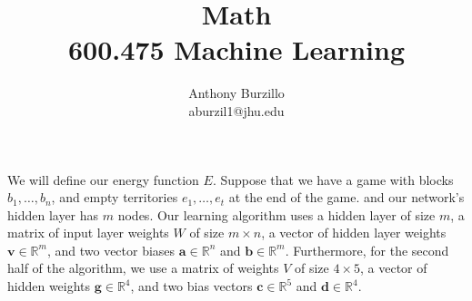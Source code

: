 \documentclass{amsart}
\title{Math\\600.475 Machine Learning}
\author{Anthony Burzillo\\aburzil1@jhu.edu}
\def\v#1{\mathbf{#1}}
\begin{document}
\maketitle

\def\touches#1#2{\mbox{touches}_{#1}{\left(#2\right)}}
\def\color#1{\mbox{color}{\left(#1\right)}}
\def\size#1{\mbox{size}{\left(#1\right)}}

We will define our energy function $E$. Suppose that we have a game with blocks $b_1, \ldots, b_n$, and empty territories
$e_1, \ldots, e_t$ at the end of the game.  and our network's hidden layer has $m$ nodes. Our learning algorithm uses a
hidden layer of size $m$, a matrix of input layer weights $W$ of size $m \times n$, a vector of hidden layer weights
$\v{ v } \in \mathbb{ R }^m$, and two vector biases $\v{ a } \in \mathbb{ R }^n$ and $\v{ b } \in \mathbb{ R }^m$.
Furthermore, for the second half of the algorithm, we use a matrix of weights $V$ of size $4 \times 5$, a vector of hidden
weights $\v{ g } \in \mathbb{ R }^4$, and two bias vectors $\v{ c } \in \mathbb{ R }^5$ and $\v{ d } \in \mathbb{ R }^4$.
\end{document}
